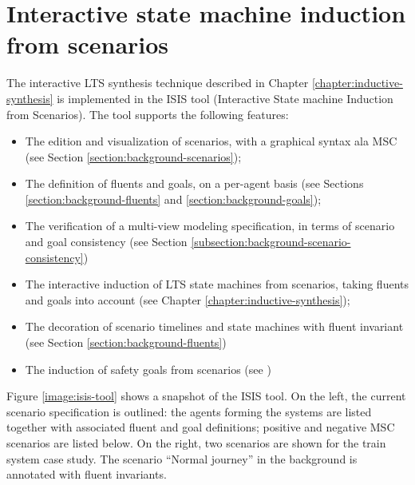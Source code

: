 \section{Interactive state machine induction from scenarios\label{section:tool-support-isis}}

The interactive LTS synthesis technique described in Chapter \ref{chapter:inductive-synthesis} is implemented in the ISIS tool (Interactive State machine Induction from Scenarios). The tool supports the following features:

\begin{itemize}
\item The edition and visualization of scenarios, with a graphical syntax ala MSC (see Section \ref{section:background-scenarios});
\item The definition of fluents and goals, on a per-agent basis (see Sections \ref{section:background-fluents} and \ref{section:background-goals});
\item The verification of a multi-view modeling specification, in terms of scenario and goal consistency (see Section \ref{subsection:background-scenario-consistency})
\item The interactive induction of LTS state machines from scenarios, taking fluents and goals into account (see Chapter \ref{chapter:inductive-synthesis});
\item The decoration of scenario timelines and state machines with fluent invariant (see Section \ref{section:background-fluents})
\item The induction of safety goals from scenarios (see \cite{Damas:2011})
\end{itemize}

Figure \ref{image:isis-tool} shows a snapshot of the ISIS tool. On the left, the current scenario specification is outlined: the agents forming the systems are listed together with associated fluent and goal definitions; positive and negative MSC scenarios are listed below. On the right, two scenarios are shown for the train system case study. The scenario ``Normal journey'' in the background is annotated with fluent invariants.

